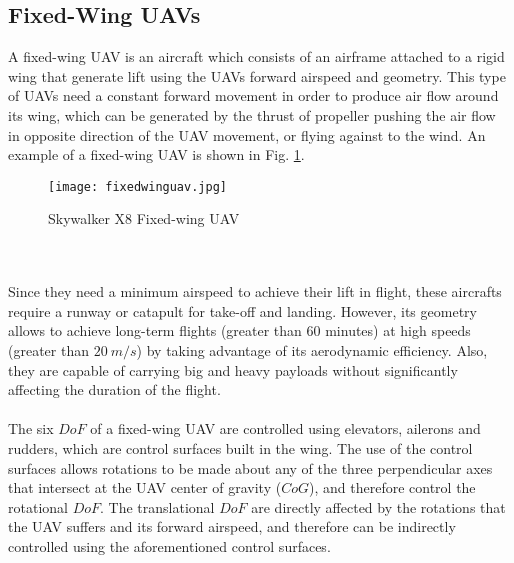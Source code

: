 \subsection{Fixed-Wing UAVs}
A fixed-wing UAV is an aircraft which consists of an airframe attached to a rigid wing that generate lift using the UAVs forward airspeed and geometry. This type of UAVs need a constant forward movement in order to produce air flow around its wing, which can be generated by the thrust of propeller pushing the air flow in opposite direction of the UAV movement, or flying against to the wind. An example of a fixed-wing UAV is shown in Fig. \ref{fig:fixedwing}.
\begin{figure}[h]
\begin{center}
\texttt{[image: fixedwinguav.jpg]}    
\caption[Skywalker X8 Fixed-wing UAV]{Skywalker X8 Fixed-wing UAV\protect\footnotemark} 
\label{fig:fixedwing}
\end{center}
\end{figure}
\\\\Since they need a minimum airspeed to achieve their lift in flight, these aircrafts require a runway or catapult for take-off and landing. However, its geometry allows to achieve long-term flights (greater than $60$ minutes) at high speeds (greater than $20\ m/s$) by taking advantage of its aerodynamic efficiency. Also, they are capable of carrying big and heavy payloads without significantly affecting the duration of the flight.
\\\\
The six $DoF$ of a fixed-wing UAV are controlled using elevators, ailerons and rudders, which are control surfaces built in the wing. The use of the control surfaces allows rotations to be made about any of the three perpendicular axes that intersect at the UAV center of gravity ($CoG$), and therefore control the rotational $DoF$. The translational $DoF$ are directly affected by the rotations that the UAV suffers and its forward airspeed, and therefore can be indirectly controlled using the aforementioned control surfaces.

